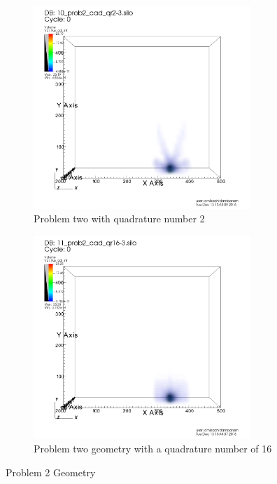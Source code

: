 \documentclass[10pt]{article}
\begin{document}
\begin{figure}[!ht]
\centering
\begin{subfigure}{0.49\textwidth}
\centering
\includegraphics[width = 0.9\textwidth]{visit/visit-prob_2-02}
\caption{Problem two with quadrature number 2}
\label{visit:prob_2-02}
\end{subfigure}
\hfill
\begin{subfigure}{0.49\textwidth}
\centering
\includegraphics[width = 0.9\textwidth]{visit/visit-prob_2-16}
\caption{Problem two geometry with a quadrature number of 16}
\label{visit:prob_2-16}
\end{subfigure}
\caption{Problem 2 Geometry}
\label{visit:prob_2}
\end{figure}
\end{document}

